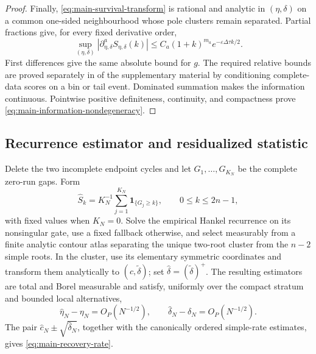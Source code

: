 \begin{proof}
Finally, \eqref{eq:main-survival-transform} is rational and analytic in \((\eta,\delta)\) on a
common one-sided neighbourhood whose pole clusters remain separated.  Partial
fractions give, for every fixed derivative order,
\begin{equation}
 \sup_{(\eta,\delta)}|\partial_{\eta,\delta}^a
 S_{\eta,\delta}(k)|
 \le C_a(1+k)^{m_a}e^{-\varepsilon\Delta\tau k/2}.
\label{eq:main-uniform-derivative-envelope}
\end{equation}
First differences give the same absolute bound for \(g\).  The required
relative bounds are proved separately in
 of the supplementary material by conditioning complete-data
scores on a bin or tail event.  Dominated summation makes the information
continuous.  Pointwise positive definiteness, continuity, and compactness
prove \eqref{eq:main-information-nondegeneracy}.
\end{proof}

\subsection{Recurrence estimator and residualized statistic}

\begin{estimator}
\label{est:serial-collision-recurrence-main}
Delete the two incomplete endpoint cycles and let
\(G_1,\ldots,G_{K_N}\) be the complete zero-run gaps.  Form
\begin{equation}
 \widehat S_k=K_N^{-1}\sum_{j=1}^{K_N}\mathbf1_{\{G_j\ge k\}},
 \qquad0\le k\le2n-1,
\label{eq:main-empirical-tail}
\end{equation}
with fixed values when \(K_N=0\).  Solve the empirical Hankel recurrence on
its nonsingular gate, use a fixed fallback otherwise, and select measurably
from a finite analytic contour atlas separating the unique two-root cluster
from the \(n-2\) simple roots.  In the cluster, use its elementary symmetric
coordinates and transform them analytically to \((c,\widetilde\delta)\);
set \(\widehat\delta=(\widetilde\delta)^+\).  The resulting estimators are
total and Borel measurable and satisfy, uniformly over the compact stratum and
bounded local alternatives,
\begin{equation}
 \widehat\eta_N-\eta_N=O_P(N^{-1/2}),\qquad
 \widehat\delta_N-\delta_N=O_P(N^{-1/2}).
\label{eq:main-regular-estimator-rate}
\end{equation}
The pair \(\widehat c_N\pm\sqrt{\widehat\delta_N}\), together with the
canonically ordered simple-rate estimates, gives \eqref{eq:main-recovery-rate}.
\end{estimator}

